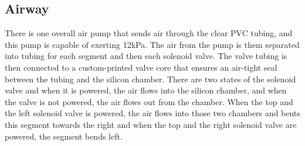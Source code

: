 \documentclass[twoside, 11pt]{article}
\begin{document}
\subsection{Airway}
There is one overall air pump that sends air through the clear PVC tubing, and this pump is capable of exerting 12kPa. The air from the pump is them separated into tubing for each segment and then each solenoid valve. The valve tubing is then connected to a custom-printed valve core that ensures an air-tight seal between the tubing and the silicon chamber. There are two states of the solenoid valve and when it is powered, the air flows into the silicon chamber, and when the valve is not powered, the air flows out from the chamber. When the top and the left solenoid valve is powered, the air flows into those two chambers and bents this segment towards the right and when the top and the right solenoid valve are powered, the segment bends left. 
\end{document}
